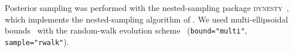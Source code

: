 
Posterior sampling was performed with the nested-sampling package
\textsc{dynesty}~\citep{speagle2020,koposov2024dynesty}, which implements
the nested-sampling algorithm of \citet{skilling2004,skilling2006}.
We used multi-ellipsoidal bounds~\citep{feroz2009multinest} with the
random-walk evolution scheme~\citep{skilling2006} (\texttt{bound="multi"},
\texttt{sample="rwalk"}).
